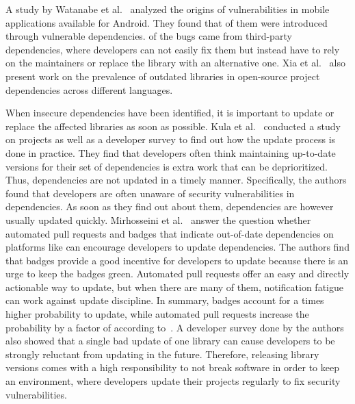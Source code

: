 A study by Watanabe et al.~\cite{watanabe2017} analyzed the origins of vulnerabilities in mobile applications available
for Android.
They found that  of them were introduced through vulnerable dependencies.
 of the bugs came from third-party dependencies, where developers can not easily fix them but instead
have to rely on the maintainers or replace the library with an alternative one.
Xia et al.~\cite{xia2014} also present work on the prevalence of outdated libraries in open-source project
dependencies across different languages.

When insecure dependencies have been identified, it is important to update or replace the affected libraries as soon as
possible.
Kula et al.~\cite{kula2017} conducted a study on \github{} projects as well as a developer survey to find out how the
update process is done in practice.
They find that developers often think maintaining up-to-date versions for their set of dependencies is extra work that
can be deprioritized.
Thus, dependencies are not updated in a timely manner.
Specifically, the authors found that developers are often unaware of security vulnerabilities in dependencies.
As soon as they find out about them, dependencies are however usually updated quickly.
Mirhosseini et al.~\cite{mirhosseini2017} answer the question whether automated pull requests and badges that indicate
out-of-date dependencies on platforms like \github{} can encourage developers to update dependencies.
The authors find that badges provide a good incentive for developers to update because there is an urge to keep the
badges green.
Automated pull requests offer an easy and directly actionable way to update, but when there are many of them,
notification fatigue can work against update discipline.
In summary, badges account for a  times higher probability to update, while automated pull requests
increase the probability by a factor of  according to~\cite{mirhosseini2017}.
A developer survey done by the authors also showed that a single bad update of one library can cause developers to be
strongly reluctant from updating in the future.
Therefore, releasing library versions comes with a high responsibility to not break software in order to keep an
environment, where developers update their projects regularly to fix security vulnerabilities.
